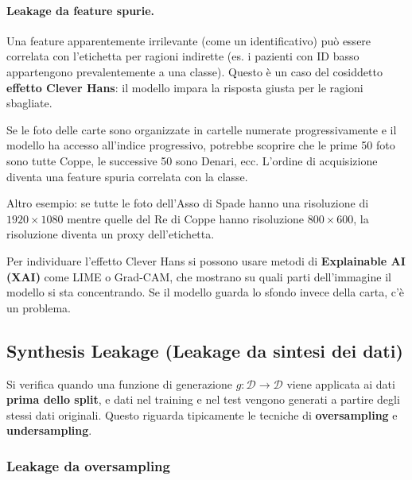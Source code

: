 \documentclass[a4paper,12pt]{article}
\begin{document}
\paragraph{Leakage da feature spurie.} Una feature apparentemente irrilevante (come un identificativo) può essere correlata con l'etichetta per ragioni indirette (es. i pazienti con ID basso appartengono prevalentemente a una classe). Questo è un caso del cosiddetto \textbf{effetto Clever Hans}: il modello impara la risposta giusta per le ragioni sbagliate.

\begin{esempio}
Se le foto delle carte sono organizzate in cartelle numerate progressivamente e il modello ha accesso all'indice progressivo, potrebbe scoprire che le prime 50 foto sono tutte Coppe, le successive 50 sono Denari, ecc. L'ordine di acquisizione diventa una feature spuria correlata con la classe.

Altro esempio: se tutte le foto dell'Asso di Spade hanno una risoluzione di $1920 \times 1080$ mentre quelle del Re di Coppe hanno risoluzione $800 \times 600$, la risoluzione diventa un proxy dell'etichetta.
\end{esempio}

\begin{consiglio}
Per individuare l'effetto Clever Hans si possono usare metodi di \textbf{Explainable AI (XAI)} come LIME o Grad-CAM, che mostrano su quali parti dell'immagine il modello si sta concentrando. Se il modello guarda lo sfondo invece della carta, c'è un problema.
\end{consiglio}

\subsection{Synthesis Leakage (Leakage da sintesi dei dati)}

Si verifica quando una funzione di generazione $g: \mathcal{D} \to \mathcal{D}$ viene applicata ai dati \textbf{prima dello split}, e dati nel training e nel test vengono generati a partire degli stessi dati originali. Questo riguarda tipicamente le tecniche di \textbf{oversampling} e \textbf{undersampling}.

\subsubsection{Leakage da oversampling}
\end{document}
